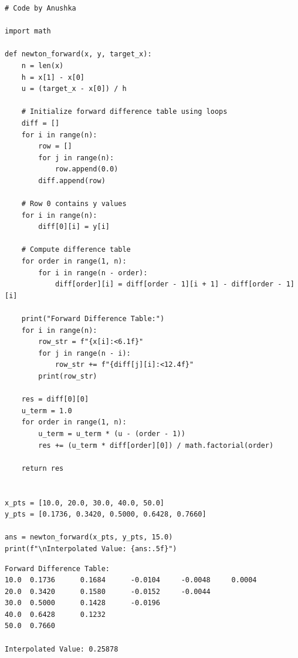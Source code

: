 \documentclass[10pt,a4paper]{report}
\begin{document}
\begin{tcolorbox}[colback=codebg,colframe=secondary,title=\textbf{Python Implementation (Step-by-Step Loops \& Pure Functions)},boxrule=1pt,arc=2mm]
\begin{lstlisting}[style=python_detailed]
# Code by Anushka

import math

def newton_forward(x, y, target_x):
    n = len(x)
    h = x[1] - x[0]
    u = (target_x - x[0]) / h

    # Initialize forward difference table using loops
    diff = []
    for i in range(n):
        row = []
        for j in range(n):
            row.append(0.0)
        diff.append(row)

    # Row 0 contains y values
    for i in range(n):
        diff[0][i] = y[i]

    # Compute difference table
    for order in range(1, n):
        for i in range(n - order):
            diff[order][i] = diff[order - 1][i + 1] - diff[order - 1][i]

    print("Forward Difference Table:")
    for i in range(n):
        row_str = f"{x[i]:<6.1f}"
        for j in range(n - i):
            row_str += f"{diff[j][i]:<12.4f}"
        print(row_str)

    res = diff[0][0]
    u_term = 1.0
    for order in range(1, n):
        u_term = u_term * (u - (order - 1))
        res += (u_term * diff[order][0]) / math.factorial(order)

    return res


x_pts = [10.0, 20.0, 30.0, 40.0, 50.0]
y_pts = [0.1736, 0.3420, 0.5000, 0.6428, 0.7660]

ans = newton_forward(x_pts, y_pts, 15.0)
print(f"\nInterpolated Value: {ans:.5f}")

\end{lstlisting}
\end{tcolorbox}

\begin{tcolorbox}[colback=termbg,colframe=primary,title=\textbf{Program Execution Output \& Convergence Table},boxrule=1pt,arc=2mm]
\begin{lstlisting}[style=terminal_output]
Forward Difference Table:
10.0  0.1736      0.1684      -0.0104     -0.0048     0.0004      
20.0  0.3420      0.1580      -0.0152     -0.0044     
30.0  0.5000      0.1428      -0.0196     
40.0  0.6428      0.1232      
50.0  0.7660      

Interpolated Value: 0.25878
\end{lstlisting}
\end{tcolorbox}
\end{document}

